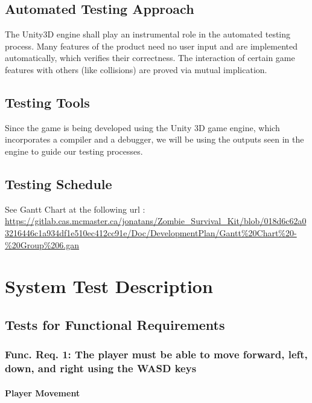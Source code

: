 \documentclass[12pt, titlepage]{article}
\begin{document}
\subsection{Automated Testing Approach}
The Unity3D engine shall play an instrumental role in the automated testing process. Many features of the product need no user input and are implemented automatically, which verifies their correctness. The interaction of certain game features with others (like collisions) are proved via mutual implication.

\subsection{Testing Tools}
Since the game is being developed using the Unity 3D game engine, which incorporates a compiler and a debugger, we will be using the outputs seen in the engine to guide our testing processes.

\subsection{Testing Schedule}
		
See Gantt Chart at the following url : \url{https://gitlab.cas.mcmaster.ca/jonatans/Zombie_Survival_Kit/blob/018d6c62a03216446c1a934df1e510ec412cc91e/Doc/DevelopmentPlan/Gantt%20Chart%20-%20Group%206.gan} 

\section{System Test Description}
	
\subsection{Tests for Functional Requirements}

\subsubsection{Func. Req. 1: The player must be able to move forward, left, down, and right using the WASD keys}
		
\paragraph{Player Movement}
\end{document}
